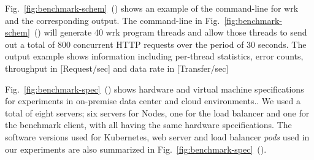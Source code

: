 Fig.~\ref{fig:benchmark-schem}~() shows an example of the command-line for wrk and the corresponding output.
The command-line in Fig.~\ref{fig:benchmark-schem}~() will generate 40 wrk program threads
and allow those threads to send out a total of 800 concurrent HTTP requests over the period of 30 seconds.
The output example shows information including per-thread statistics, error counts, throughput in [Request/sec] and data rate in [Transfer/sec]

Fig.~\ref{fig:benchmark-spec}~() shows hardware and virtual machine specifications for experiments in on-premise data center and cloud environments..
We used a total of eight servers; six servers for Nodes, one for the load balancer and one for the benchmark client, with all having the same hardware specifications.
The software versions used for Kubernetes, web server and load balancer {\em pods} used in our experiments are also summarized in Fig.~\ref{fig:benchmark-spec}~().

